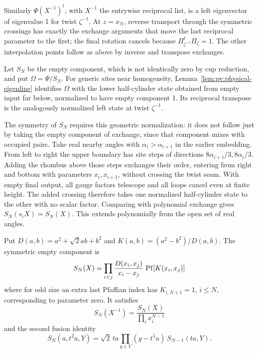 Similarly \(\Psi(X^{-1})^t\), with \(X^{-1}\) the entrywise reciprocal
list, is a left eigenvector of eigenvalue 1 for twist \(\zeta^{-1}\).
At \(z=x_N\), reverse transport through the symmetric crossings has
exactly the exchange arguments that move the last reciprocal parameter
to the first; the final rotation cancels because
\(\Pi_{\zeta^{-1}}^t\Pi_\zeta=1\). The other interpolation points
follow as above by inverse and transpose exchanges.

Let \(S_N\) be the empty component, which is not identically zero by
cup reduction, and put \(\Omega=\Psi/S_N\). For generic sites near
homogeneity, Lemma~\ref{lem:pv:physical-eigenline} identifies \(\Omega\)
with the lower half-cylinder state obtained from empty input far below,
normalized to have empty component 1. Its reciprocal transpose is the
analogously normalized left state at twist \(\zeta^{-1}\).

The symmetry of \(S_N\) requires this geometric normalization: it does
not follow just by taking the empty component of exchange, since that
component mixes with occupied pairs. Take real nearby angles with
\(\alpha_i>\alpha_{i+1}\) in the earlier embedding. From left to
right the upper boundary has site steps of directions
\(8\alpha_{i+1}/3,8\alpha_i/3\). Adding the rhombus above those
steps exchanges their order, entering from right and bottom with
parameters \(x_i,x_{i+1}\), without crossing the twist seam.
With empty final output, all gauge factors telescope and all loops
cancel even at finite height. The added crossing therefore takes one
normalized half-cylinder state to the other with no scalar factor.
Comparing with polynomial exchange gives \(S_N(s_iX)=S_N(X)\).
This extends polynomially from the open set of real angles.

\begin{proposition}\label{prop:pv:empty-component}
Put \(D(a,b)=a^2+\sqrt2 ab+b^2\) and
\(K(a,b)=(a^2-b^2)/D(a,b)\). The symmetric empty component is
\[
 S_N(X)=\prod_{i<j}\frac{D(x_i,x_j)}{x_i-x_j}\ {\rm Pf}[K(x_i,x_j)]
\]
where for odd size an extra last Pfaffian index has
\(K_{i,N+1}=1\), \(i\le N\), corresponding to parameter zero.
It satisfies
\[
 S_N(X^{-1})=\frac{S_N(X)}{\prod_i x_i^{N-1}}
\]
and the second fusion identity
\[
 S_N(a,t^2a,Y)=\sqrt2\,t a\prod_{y\in Y}(y-t^5 a)\ S_{N-1}(ta,Y).
\]
\end{proposition}


